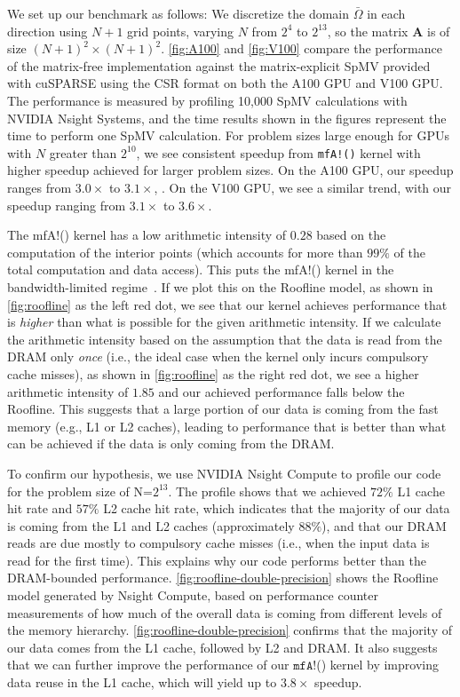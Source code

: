 We set up our benchmark as follows: We discretize the domain $\bar{\Omega}$ in each
direction using $N+1$ grid points, varying $N$ from $2^4$ to $2^{13}$, so the
matrix $\boldsymbol{A}$ is of size $(N+1)^2 \times (N+1)^2$. \autoref{fig:A100} and \autoref{fig:V100} compare the performance of the
matrix-free implementation against the matrix-explicit SpMV provided with
cuSPARSE using the CSR format on both the A100 GPU and V100 GPU.
The performance is measured by profiling 10,000 SpMV calculations with NVIDIA Nsight Systems, and the time results shown in the figures represent the time to perform one SpMV calculation.
For problem sizes large enough for GPUs with $N$ greater than $2^{10}$, we see consistent speedup from \texttt{mfA!()} kernel with higher speedup achieved for larger problem sizes. 
On the A100 GPU, our speedup ranges from $3.0\times$ to $3.1\times$, .
On the V100 GPU, we see a similar trend, with our speedup ranging from $3.1\times$ to $3.6\times$.

The {\ttfamily mfA!}() kernel has a low arithmetic intensity of $0.28$ based on the computation of the interior points (which accounts for more than $99\%$ of the total computation and data access).
This puts the {\ttfamily mfA!}() kernel in the bandwidth-limited regime~\cite{ding2019instruction}.
If we plot this on the Roofline model, as shown in \autoref{fig:roofline} as the left red dot, we see that our kernel achieves performance that is \emph{higher} than what is possible for the given arithmetic intensity.
If we calculate the arithmetic intensity based on the assumption that the data is read from the DRAM only \emph{once} (i.e., the ideal case when the kernel only incurs compulsory cache misses), as shown in \autoref{fig:roofline} as the right red dot, we see a higher arithmetic intensity of $1.85$ and our achieved performance falls below the Roofline.
This suggests that a large portion of our data is coming from the fast memory (e.g., L1 or L2 caches), leading to performance that is better than what can be achieved if the data is only coming from the DRAM.

To confirm our hypothesis, we use NVIDIA Nsight Compute to profile our code for the problem size of N=$2^{13}$.
The profile shows that we achieved $72\%$ L1 cache hit rate and $57\%$ L2 cache hit rate, which indicates that the majority of our data is coming from the L1 and L2 caches (approximately $88\%$), and that our DRAM reads are due mostly to compulsory cache misses (i.e., when the input data is read for the first time).
This explains why our code performs better than the DRAM-bounded performance.
\autoref{fig:roofline-double-precision} shows the Roofline model generated by Nsight Compute, based on performance counter measurements of how much of the overall data is coming from different levels of the memory hierarchy.
\autoref{fig:roofline-double-precision} confirms that the majority of our data comes from the L1 cache, followed by L2 and DRAM.
It also suggests that we can further improve the performance of our $\texttt{mfA!}$() kernel by improving data reuse in the L1 cache, which will yield up to $3.8\times$ speedup.


